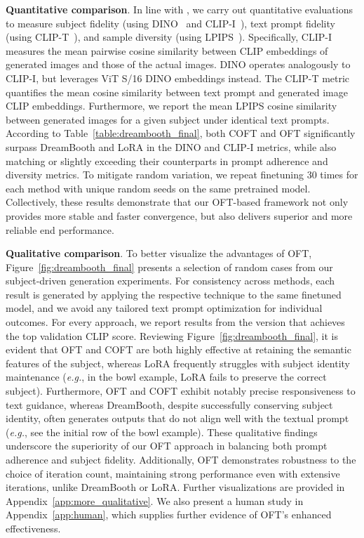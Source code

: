 \textbf{Quantitative comparison}. In line with \cite{ruiz2023dreambooth}, we carry out quantitative evaluations to measure subject fidelity (using DINO~\cite{caron2021emerging} and CLIP-I~\cite{radford2021learning}), text prompt fidelity (using CLIP-T~\cite{radford2021learning}), and sample diversity (using LPIPS~\cite{zhang2018unreasonable}). Specifically, CLIP-I measures the mean pairwise cosine similarity between CLIP embeddings of generated images and those of the actual images. DINO operates analogously to CLIP-I, but leverages ViT S/16 DINO embeddings instead. The CLIP-T metric quantifies the mean cosine similarity between text prompt and generated image CLIP embeddings. Furthermore, we report the mean LPIPS cosine similarity between generated images for a given subject under identical text prompts. According to Table~\ref{table:dreambooth_final}, both COFT and OFT significantly surpass DreamBooth and LoRA in the DINO and CLIP-I metrics, while also matching or slightly exceeding their counterparts in prompt adherence and diversity metrics. To mitigate random variation, we repeat finetuning 30 times for each method with unique random seeds on the same pretrained model. Collectively, these results demonstrate that our OFT-based framework not only provides more stable and faster convergence, but also delivers superior and more reliable end performance.

\textbf{Qualitative comparison}. To better visualize the advantages of OFT, Figure~\ref{fig:dreambooth_final} presents a selection of random cases from our subject-driven generation experiments. For consistency across methods, each result is generated by applying the respective technique to the same finetuned model, and we avoid any tailored text prompt optimization for individual outcomes. For every approach, we report results from the version that achieves the top validation CLIP score. Reviewing Figure~\ref{fig:dreambooth_final}, it is evident that OFT and COFT are both highly effective at retaining the semantic features of the subject, whereas LoRA frequently struggles with subject identity maintenance (\emph{e.g.}, in the bowl example, LoRA fails to preserve the correct subject). Furthermore, OFT and COFT exhibit notably precise responsiveness to text guidance, whereas DreamBooth, despite successfully conserving subject identity, often generates outputs that do not align well with the textual prompt (\emph{e.g.}, see the initial row of the bowl example). These qualitative findings underscore the superiority of our OFT approach in balancing both prompt adherence and subject fidelity. Additionally, OFT demonstrates robustness to the choice of iteration count, maintaining strong performance even with extensive iterations, unlike DreamBooth or LoRA. Further visualizations are provided in Appendix~\ref{app:more_qualitative}. We also present a human study in Appendix~\ref{app:human}, which supplies further evidence of OFT’s enhanced effectiveness.

